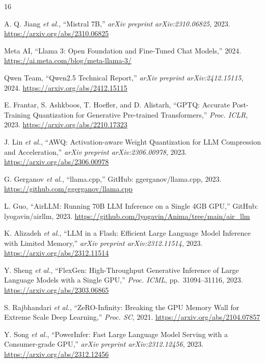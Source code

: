 \documentclass[10pt,a4paper]{article}
\newcommand{\etal}{\textit{et al.}}
\begin{document}
\begin{thebibliography}{16}

A. Q. Jiang \etal, ``Mistral 7B,'' \textit{arXiv preprint arXiv:2310.06825}, 2023.
\url{https://arxiv.org/abs/2310.06825}

Meta AI, ``Llama 3: Open Foundation and Fine-Tuned Chat Models,'' 2024.
\url{https://ai.meta.com/blog/meta-llama-3/}

Qwen Team, ``Qwen2.5 Technical Report,'' \textit{arXiv preprint arXiv:2412.15115}, 2024.
\url{https://arxiv.org/abs/2412.15115}

E. Frantar, S. Ashkboos, T. Hoefler, and D. Alistarh, ``GPTQ: Accurate
Post-Training Quantization for Generative Pre-trained Transformers,''
\textit{Proc. ICLR}, 2023. \url{https://arxiv.org/abs/2210.17323}

J. Lin \etal, ``AWQ: Activation-aware Weight Quantization for LLM Compression and
Acceleration,'' \textit{arXiv preprint arXiv:2306.00978}, 2023.
\url{https://arxiv.org/abs/2306.00978}

G. Gerganov \etal, ``llama.cpp,'' GitHub: ggerganov/llama.cpp, 2023.
\url{https://github.com/ggerganov/llama.cpp}

L. Guo, ``AirLLM: Running 70B LLM Inference on a Single 4GB GPU,'' GitHub:
lyogavin/airllm, 2023. \url{https://github.com/lyogavin/Anima/tree/main/air_llm}

K. Alizadeh \etal, ``LLM in a Flash: Efficient Large Language Model Inference with
Limited Memory,'' \textit{arXiv preprint arXiv:2312.11514}, 2023.
\url{https://arxiv.org/abs/2312.11514}

Y. Sheng \etal, ``FlexGen: High-Throughput Generative Inference of Large Language
Models with a Single GPU,'' \textit{Proc. ICML}, pp.\ 31094--31116, 2023.
\url{https://arxiv.org/abs/2303.06865}

S. Rajbhandari \etal, ``ZeRO-Infinity: Breaking the GPU Memory Wall for Extreme
Scale Deep Learning,'' \textit{Proc. SC}, 2021.
\url{https://arxiv.org/abs/2104.07857}

Y. Song \etal, ``PowerInfer: Fast Large Language Model Serving with a
Consumer-grade GPU,'' \textit{arXiv preprint arXiv:2312.12456}, 2023.
\url{https://arxiv.org/abs/2312.12456}


\end{thebibliography}
\end{document}
